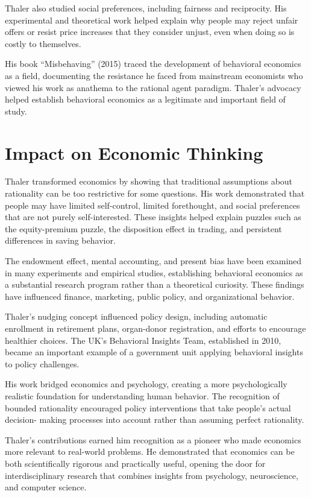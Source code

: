 Thaler also studied social preferences, including fairness and reciprocity. His
experimental and theoretical work helped explain why people may reject unfair
offers or resist price increases that they consider unjust, even when doing so
is costly to themselves.

His book ``Misbehaving'' (2015) traced the development of behavioral economics
as a field, documenting the resistance he faced from mainstream economists
who viewed his work as anathema to the rational agent paradigm. Thaler's
advocacy helped establish behavioral economics as a legitimate and important
field of study.

\section{Impact on Economic Thinking}
Thaler transformed economics by showing that traditional assumptions about
rationality can be too restrictive for some questions. His work demonstrated
that people may have limited self-control, limited forethought, and social
preferences that are not purely self-interested. These insights helped explain
puzzles such as the equity-premium puzzle, the disposition effect in trading,
and persistent differences in saving behavior.

The endowment effect, mental accounting, and present bias have been examined in
many experiments and empirical studies, establishing behavioral economics as a
substantial research program rather than a theoretical curiosity. These findings
have influenced finance, marketing, public policy, and organizational behavior.

Thaler's nudging concept influenced policy design, including automatic enrollment
in retirement plans, organ-donor registration, and efforts to encourage healthier
choices. The UK's Behavioral Insights Team, established in 2010, became an
important example of a government unit applying behavioral insights to policy
challenges.

His work bridged economics and psychology, creating a more psychologically
realistic foundation for understanding human behavior. The recognition of bounded
rationality encouraged policy interventions that take people's actual decision-
making processes into account rather than assuming perfect rationality.

Thaler's contributions earned him recognition as a pioneer who made economics
more relevant to real-world problems. He demonstrated that economics can be
both scientifically rigorous and practically useful, opening the door for
interdisciplinary research that combines insights from psychology, neuroscience,
and computer science.

